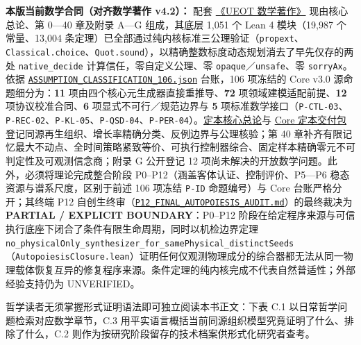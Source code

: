 \documentclass[
  11pt,
  oneside]{book}
\begin{document}
\textbf{本版当前数学合同（对齐数学著作 v4.2）：} 配套 \href{https://github.com/MurphyHoops/UEOT/blob/3d443ec29eb17af1fc00699a74e2d42d73516d81/mathematics/UEOT_MATHEMATICS.md}{《UEOT 数学著作》} 现由核心总论、第 0---40 章及附录 A---G 组成，其底层 1,051 个 Lean 4 模块（19,987 个常量、13,004 条定理）已全部通过纯内核标准三公理验证（\texttt{propext}、\texttt{Classical.choice}、\texttt{Quot.sound}），以精确整数标度动态规划消去了早先仅存的两处 \texttt{native\_decide} 计算信任，零自定义公理、零 \texttt{opaque}／\texttt{unsafe}、零 \texttt{sorryAx}。依据 \href{https://github.com/MurphyHoops/UEOT/blob/3d443ec29eb17af1fc00699a74e2d42d73516d81/formalization/ueot-core/docs/ASSUMPTION_CLASSIFICATION_106.json}{\nolinkurl{ASSUMPTION_CLASSIFICATION_106.json}} 台账，106 项冻结的 Core v3.0 源命题细分为：\textbf{11} 项由四个核心元生成器直接重推导、\textbf{72} 项领域建模适配前提、\textbf{12} 项协议校准合同、\textbf{6} 项显式不可行／规范边界与 \textbf{5} 项标准数学接口（\texttt{P-CTL-03}、\texttt{P-REC-02}、\texttt{P-KL-05}、\texttt{P-QSD-04}、\texttt{P-PER-04}）。\href{https://github.com/MurphyHoops/UEOT/blob/3d443ec29eb17af1fc00699a74e2d42d73516d81/mathematics/UEOT_MATHEMATICS.md\#core-theory}{定本核心总论}与 \href{https://github.com/MurphyHoops/UEOT/blob/3d443ec29eb17af1fc00699a74e2d42d73516d81/formalization/ueot-core/docs/compression/theory_completion/unified_closure/core_theory_closure_v1/README.md}{Core 定本交付包}登记同源再生组织、增长率精确分类、反例边界与公理核验；第 40 章补齐有限记忆最大不动点、全时间策略紧致等价、可执行控制器综合、固定样本精确零元不可判定性及可观测信念商；附录 G 公开登记 12 项尚未解决的开放数学问题。此外，必须将理论完成整合阶段 P0--P12（涵盖客体认证、控制评价、P5---P6 稳态资源与谱系尺度，区别于前述 106 项冻结 \texttt{P-ID} 命题编号）与 Core 台账严格分开；其终端 P12 自创生终审（\href{https://github.com/MurphyHoops/UEOT/blob/3d443ec29eb17af1fc00699a74e2d42d73516d81/formalization/ueot-core/docs/compression/theory_completion/P12_FINAL_AUTOPOIESIS_AUDIT.md}{\nolinkurl{P12_FINAL_AUTOPOIESIS_AUDIT.md}}）的最终裁决为 \textbf{PARTIAL / EXPLICIT BOUNDARY}：P0--P12 阶段在给定程序来源与可信执行底座下闭合了条件有限生命周期，同时以机检边界定理 \nolinkurl{no_physicalOnly_synthesizer_for_samePhysical_distinctSeeds}（\texttt{AutopoiesisClosure.lean}）证明任何仅观测物理成分的综合器都无法从同一物理载体恢复互异的修复程序来源。条件定理的纯内核完成不代表自然普适性；外部经验支持仍为 UNVERIFIED。

哲学读者无须掌握形式证明语法即可独立阅读本书正文：下表 C.1 以日常哲学问题检索对应数学章节，C.3 用平实语言概括当前同源组织模型究竟证明了什么、排除了什么，C.2 则作为按研究阶段留存的技术档案供形式化研究者查考。
\end{document}
